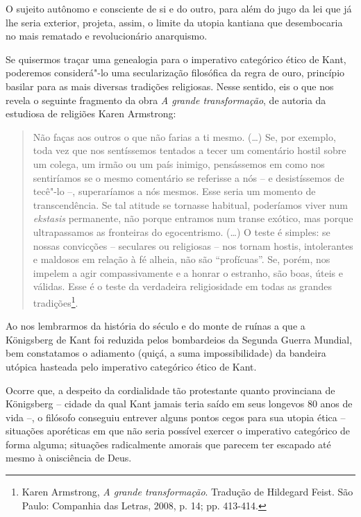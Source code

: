O sujeito autônomo e consciente de si e do outro, para além do jugo da
lei que já lhe seria exterior, projeta, assim, o limite da utopia
kantiana que desembocaria no mais rematado e revolucionário anarquismo.

Se quisermos traçar uma genealogia para o imperativo categórico ético de
Kant, poderemos considerá"-lo uma secularização filosófica da regra de
ouro, princípio basilar para as mais diversas tradições religiosas.
Nesse sentido, eis o que nos revela o seguinte fragmento da obra \emph{A
grande transformação}, de autoria da estudiosa de religiões Karen
Armstrong:

\begin{quote}
Não faças aos outros o que não farias a ti mesmo. (\ldots{}) Se, por exemplo,
toda vez que nos sentíssemos tentados a tecer um comentário hostil sobre
um colega, um irmão ou um país inimigo, pensássemos em como nos
sentiríamos se o mesmo comentário se referisse a nós -- e desistíssemos
de tecê"-lo --, superaríamos a nós mesmos. Esse seria um momento de
transcendência. Se tal atitude se tornasse habitual, poderíamos viver
num \emph{ekstasis} permanente, não porque entramos num transe exótico,
mas porque ultrapassamos as fronteiras do egocentrismo. (\ldots{}) O teste é
simples: se nossas convicções -- seculares ou religiosas -- nos tornam
hostis, intolerantes e maldosos em relação à fé alheia, não são
``profícuas''. Se, porém, nos impelem a agir compassivamente e a honrar
o estranho, são boas, úteis e válidas. Esse é o teste da verdadeira
religiosidade em todas as grandes tradições\footnote{Karen Armstrong,
  \emph{A grande transformação}. Tradução de Hildegard Feist. São Paulo:
  Companhia das Letras, 2008, p. 14; pp. 413-414.}.
\end{quote}

Ao nos lembrarmos da história do século  e do monte de ruínas a que a
Königsberg de Kant foi reduzida pelos bombardeios da Segunda Guerra
Mundial, bem constatamos o adiamento (quiçá, a suma impossibilidade) da
bandeira utópica hasteada pelo imperativo categórico ético de Kant.

Ocorre que, a despeito da cordialidade tão protestante quanto
provinciana de Königsberg -- cidade da qual Kant jamais teria saído em
seus longevos 80 anos de vida --, o filósofo conseguiu entrever alguns
pontos cegos para sua utopia ética -- situações aporéticas em que não
seria possível exercer o imperativo categórico de forma alguma;
situações radicalmente amorais que parecem ter escapado até mesmo à
onisciência de Deus.

